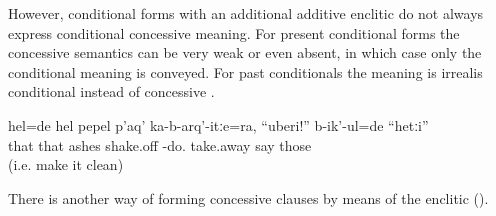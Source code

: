 However, conditional forms with an additional additive enclitic do not always express conditional concessive meaning. For present conditional forms the concessive semantics can be very weak  or even absent, in which case only the conditional meaning is conveyed. For past conditionals the meaning is irrealis conditional instead of concessive .
%
\begin{exe}
	\ex	\label{ex:If you let the ashes of your cigarette fall down}
	\gll	hel=de		hel	pepel	p'aq'	ka-b-arq'-itːe=ra,	``uberi!''	b-ik'-ul=de	``hetːi''\\
		that	that	ashes	shake.off	-do.	take.away	say	those\\
	\glt	{} (i.e. make it clean)
\end{exe}

There is another way of forming concessive clauses by means of the enclitic  ().





